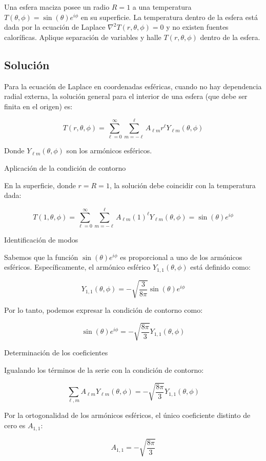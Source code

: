 \documentclass[a4paper]{article}
\begin{document}
Una esfera maciza posee un radio $R = 1$ a una temperatura $T(\theta, \phi) = \sin(\theta)e^{i\phi}$ en su superficie. La temperatura dentro de la esfera está dada por la ecuación de Laplace $\nabla^2 T(r, \theta, \phi) = 0$ y no existen fuentes caloríficas. Aplique separación de variables y halle $T(r, \theta, \phi)$ dentro de la esfera.

\subsection{Solución}

Para la ecuación de Laplace en coordenadas esféricas, cuando no hay dependencia radial externa, la solución general para el interior de una esfera (que debe ser finita en el origen) es:

$$T(r, \theta, \phi) = \sum_{\ell=0}^{\infty} \sum_{m=-\ell}^{\ell} A_{\ell m} r^\ell Y_{\ell m}(\theta, \phi)$$

Donde $Y_{\ell m}(\theta, \phi)$ son los armónicos esféricos.

Aplicación de la condición de contorno

En la superficie, donde $r = R = 1$, la solución debe coincidir con la temperatura dada:

$$T(1, \theta, \phi) = \sum_{\ell=0}^{\infty} \sum_{m=-\ell}^{\ell} A_{\ell m} (1)^\ell Y_{\ell m}(\theta, \phi) = \sin(\theta)e^{i\phi}$$

Identificación de modos

Sabemos que la función $\sin(\theta)e^{i\phi}$ es proporcional a uno de los armónicos esféricos. Específicamente, el armónico esférico $Y_{1,1}(\theta, \phi)$ está definido como:

$$Y_{1,1}(\theta, \phi) = -\sqrt{\frac{3}{8\pi}} \sin(\theta)e^{i\phi}$$

Por lo tanto, podemos expresar la condición de contorno como:

$$\sin(\theta)e^{i\phi} = -\sqrt{\frac{8\pi}{3}} Y_{1,1}(\theta, \phi)$$

Determinación de los coeficientes

Igualando los términos de la serie con la condición de contorno:

$$\sum_{\ell, m} A_{\ell m} Y_{\ell m}(\theta, \phi) = -\sqrt{\frac{8\pi}{3}} Y_{1,1}(\theta, \phi)$$

Por la ortogonalidad de los armónicos esféricos, el único coeficiente distinto de cero es $A_{1,1}$:

$$A_{1,1} = -\sqrt{\frac{8\pi}{3}}$$
\end{document}
